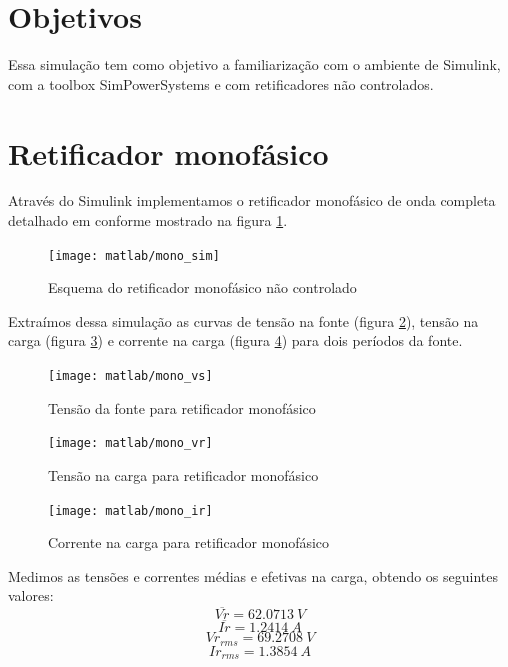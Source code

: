 \documentclass{report}
\begin{document}


\onehalfspacing
\section{Objetivos}
	Essa simulação tem como objetivo a familiarização com o ambiente de Simulink, com a toolbox SimPowerSystems e com retificadores não controlados.
	 
\section{Retificador monofásico}
Através do Simulink implementamos o retificador monofásico de onda completa detalhado em \cite{bb:roteirosim1} conforme mostrado na figura \ref{fig:mesq}.
\begin{figure}[H]
	\centering
	\texttt{[image: matlab/mono\_sim]}
	\caption{Esquema do retificador monofásico não controlado}
	\label{fig:mesq}
\end{figure}

Extraímos dessa simulação as curvas de tensão na fonte (figura \ref{fig:mvs}), tensão na carga (figura \ref{fig:mvr}) e corrente na carga (figura \ref{fig:mir}) para dois períodos da fonte.
\begin{figure}[H]
	\centering
	\texttt{[image: matlab/mono\_vs]}
	\caption{Tensão da fonte para retificador monofásico}
	\label{fig:mvs}
\end{figure}
\begin{figure}[H]
	\centering
	\texttt{[image: matlab/mono\_vr]}
	\caption{Tensão na carga para retificador monofásico}
	\label{fig:mvr}
\end{figure}
\begin{figure}[H]
	\centering
	\texttt{[image: matlab/mono\_ir]}
	\caption{Corrente na carga para retificador monofásico}
	\label{fig:mir}
\end{figure}

Medimos as tensões e correntes médias e efetivas na carga, obtendo os seguintes valores:
\begin{equation}
\overline{Vr} = 62.0713\ V
\end{equation}
\begin{equation}
\overline{Ir} = 1.2414\ A
\end{equation}
\begin{equation}
Vr_{rms} =  69.2708\ V
\end{equation}
\begin{equation}
Ir_{rms} = 1.3854\ A
\end{equation}
\end{document}
